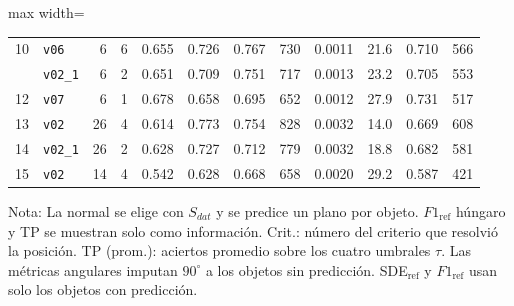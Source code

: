\begin{table}[htbp]
\begin{lrbox}{\tablebox}
\begin{adjustbox}{max width=\textwidth}
\begin{tabular}{rlrcrrrrrrrr}
10 & \texttt{v06} & 6 & 6 & 0.655 & 0.726 & 0.767 & 730 & 0.0011 & 21.6 & 0.710 & 566 \\
\addlinespace
11 & \texttt{v02\_1} & 6 & 2 & 0.651 & 0.709 & 0.751 & 717 & 0.0013 & 23.2 & 0.705 & 553 \\
12 & \texttt{v07} & 6 & 1 & 0.678 & 0.658 & 0.695 & 652 & 0.0012 & 27.9 & 0.731 & 517 \\
13 & \texttt{v02} & 26 & 4 & 0.614 & 0.773 & 0.754 & 828 & 0.0032 & 14.0 & 0.669 & 608 \\
14 & \texttt{v02\_1} & 26 & 2 & 0.628 & 0.727 & 0.712 & 779 & 0.0032 & 18.8 & 0.682 & 581 \\
15 & \texttt{v02} & 14 & 4 & 0.542 & 0.628 & 0.668 & 658 & 0.0020 & 29.2 & 0.587 & 421 \\
\bottomrule
\end{tabular}
\end{adjustbox}
\end{lrbox}
\usebox{\tablebox}

\vspace{1.5ex}
\begin{minipage}{\wd\tablebox}
\footnotesize
Nota: La normal se elige con $S_{dat}$ y se predice un plano por objeto. $F1_{\mathrm{ref}}$ húngaro y TP se muestran solo como información. Crit.: número del criterio que resolvió la posición. TP (prom.): aciertos promedio sobre los cuatro umbrales $\tau$. Las métricas angulares imputan $90^\circ$ a los objetos sin predicción. SDE$_{\mathrm{ref}}$ y $F1_{\mathrm{ref}}$ usan solo los objetos con predicción.
\end{minipage}
\end{table}

\clearpage


